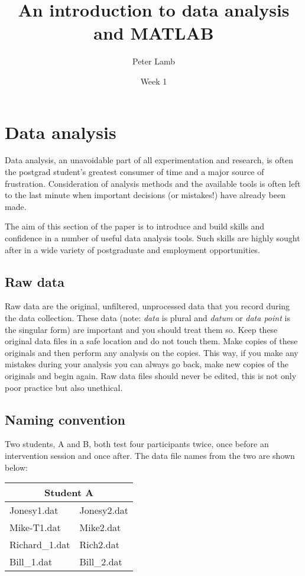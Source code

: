 \documentclass[12pt,a4paper]{article}
\title{An introduction to data analysis and MATLAB}
\author{Peter Lamb}
\date{Week 1}
\begin{document}
\maketitle

\section{Data analysis}
Data analysis, an unavoidable part of all experimentation and research, is often the postgrad student's greatest consumer of time and a major source of frustration.  
Consideration of analysis methods and the available tools is often left to the last minute when important decisions (or mistakes!) have already been made.

The aim of this section of the paper is to introduce and build skills and confidence in a number of useful data analysis tools.  
Such skills are highly sought after in a wide variety of postgraduate and employment opportunities.

\subsection{Raw data}
Raw data are the original, unfiltered, unprocessed data that you record during the data collection.  
These data (note: \emph{data} is plural and \emph{datum} or \emph{data point} is the singular form) are important and you should treat them so.  
Keep these original data files in a safe location and do not touch them.  
Make copies of these originals and then perform any analysis on the copies.  
This way, if you make any mistakes during your analysis you can always go back, make new copies of the originals and begin again.
Raw data files should never be edited, this is not only poor practice but also unethical.

\subsection{Naming convention}
Two students, A and B, both test four participants twice, once before an intervention session and once after.  
The data file names from the two are shown below:

\begin{table}[H]
  \begin{center}
    \begin{tabular}{|l|l|}
    \hline
    \multicolumn{2}{|c|}{Student A} \\
    \hline
    Jonesy1.dat & Jonesy2.dat \\
    \hline
    Mike-T1.dat & Mike2.dat \\
    \hline
    Richard\_1.dat & Rich2.dat \\
    \hline
    Bill\_1.dat & Bill\_2.dat \\
    \hline
    \end{tabular}
  \end{center}  
  \label{tab:namingconventionsa}
\end{table}
\end{document}
